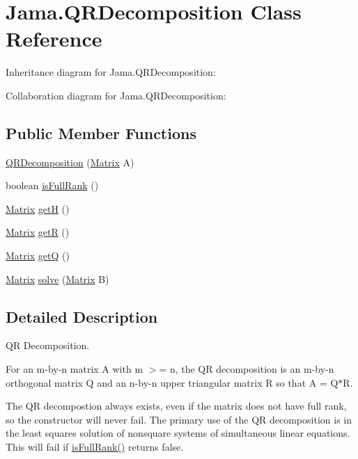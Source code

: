 \hypertarget{class_jama_1_1_q_r_decomposition}{\section{Jama.\+Q\+R\+Decomposition Class Reference}
\label{class_jama_1_1_q_r_decomposition}
}


Inheritance diagram for Jama.\+Q\+R\+Decomposition\+:


Collaboration diagram for Jama.\+Q\+R\+Decomposition\+:
\subsection*{Public Member Functions}
\begin{DoxyCompactItemize}
\item 
\hyperlink{class_jama_1_1_q_r_decomposition_a7c423029f5324b7c2b3ce3e9f2274512}{Q\+R\+Decomposition} (\hyperlink{class_jama_1_1_matrix}{Matrix} A)
\item 
boolean \hyperlink{class_jama_1_1_q_r_decomposition_ab7a81bd679ece0dd255aa3a786e2efed}{is\+Full\+Rank} ()
\item 
\hyperlink{class_jama_1_1_matrix}{Matrix} \hyperlink{class_jama_1_1_q_r_decomposition_a700a752da9386dc6db76dcd03d93f756}{get\+H} ()
\item 
\hyperlink{class_jama_1_1_matrix}{Matrix} \hyperlink{class_jama_1_1_q_r_decomposition_a918a7ff1594770cd4ee02e67241ef768}{get\+R} ()
\item 
\hyperlink{class_jama_1_1_matrix}{Matrix} \hyperlink{class_jama_1_1_q_r_decomposition_ae2f72dd0466a1500e0c01efbb5c8bfa7}{get\+Q} ()
\item 
\hyperlink{class_jama_1_1_matrix}{Matrix} \hyperlink{class_jama_1_1_q_r_decomposition_ae6434a5c9faebf49cc163ef7c3ba9048}{solve} (\hyperlink{class_jama_1_1_matrix}{Matrix} B)
\end{DoxyCompactItemize}


\subsection{Detailed Description}
Q\+R Decomposition. 

For an m-\/by-\/n matrix A with m $>$= n, the Q\+R decomposition is an m-\/by-\/n orthogonal matrix Q and an n-\/by-\/n upper triangular matrix R so that A = Q$\ast$\+R. 

The Q\+R decompostion always exists, even if the matrix does not have full rank, so the constructor will never fail. The primary use of the Q\+R decomposition is in the least squares solution of nonsquare systems of simultaneous linear equations. This will fail if \hyperlink{class_jama_1_1_q_r_decomposition_ab7a81bd679ece0dd255aa3a786e2efed}{is\+Full\+Rank()} returns false. 


